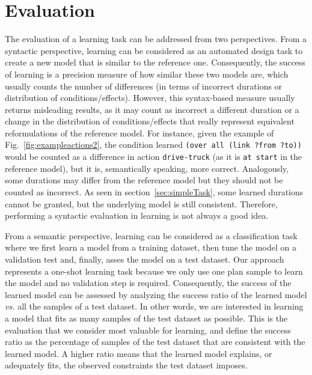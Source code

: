 \documentclass[runningheads]{llncs}
\begin{document}
\section{Evaluation}
\label{sec:evaluation}

The evaluation of a learning task can be addressed from two perspectives. From a syntactic perspective, learning can be considered as an automated design task to create a new model that is similar to the reference one. Consequently, the success of learning is a precision measure of how similar these two models are, which usually counts the number of differences (in terms of incorrect durations or distribution of conditions/effects). However, this syntax-based measure usually returns misleading results, as it may count as incorrect a different duration or a change in the distribution of conditions/effects that really represent equivalent reformulations of the reference model. For instance, given the example of Fig.~\ref{fig:exampleactions2}, the condition learned \texttt{(over all (link ?from ?to))} would be counted as a difference in action \texttt{drive-truck} (as it is \texttt{at start} in the reference model), but it is, semantically speaking, more correct. Analogously, some durations may differ from the reference model but they should not be counted as incorrect. As seen in section~\ref{sec:simpleTask}, some learned durations cannot be granted, but the underlying model is still consistent. Therefore, performing a syntactic evaluation in learning is not always a good idea.


From a semantic perspective, learning can be considered as a classification task where we first learn a model from a training dataset, then tune the model on a validation test and, finally, asses the model on a test dataset. Our approach represents a one-shot learning task because we only use one plan sample to learn the model and no validation step is required.
Consequently, the success of the learned model can be assessed by analyzing the success ratio of the learned model \emph{vs.} all the samples of a test dataset. In other words, we are interested in learning a model that fits as many samples of the test dataset as possible. This is the evaluation that we consider most valuable for learning, and define the success ratio as the percentage of samples of the test dataset that are consistent with the learned model. A higher ratio means that the learned model explains, or adequately fits, the observed constraints the test dataset imposes.
\end{document}
